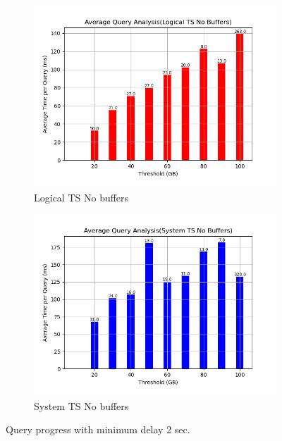 \begin{figure}
\begin{subfigure}[c]{0.45\textwidth}
	\end{subfigure}
	\begin{subfigure}[c]{0.45\textwidth}
		\includegraphics[width=1\textwidth]   {figures/Experiments/Dynamic/Progress/2/average_query_time_per_batch_version_999777016_10485760_10_delay[2].png}
		\caption{Logical TS No buffers}
		\label{fig:progress-queries-2-logical-no-buffers}
	\end{subfigure}
	\begin{subfigure}[c]{0.45\textwidth}
		\includegraphics[width=1\textwidth]   {figures/Experiments/Dynamic/Progress/2/average_query_time_per_batch_version_999777017_10485760_10_delay[2].png}
		\caption{System TS No buffers}
		\label{fig:progress-queries-2-system-no-buffers}
	\end{subfigure}
	\caption{Query progress with minimum delay 2 sec.}
	\label{fig:query-progress-delay-2}
\end{figure}

